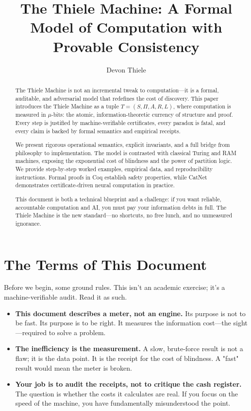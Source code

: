 \documentclass[11pt]{article}
\title{The Thiele Machine: A Formal Model of Computation with Provable Consistency}
\author{Devon Thiele}
\date{}
\begin{document}
\maketitle

\begin{abstract}
The Thiele Machine is not an incremental tweak to computation—it is a formal, auditable, and adversarial model that redefines the cost of discovery. This paper introduces the Thiele Machine as a tuple $T = (S, \Pi, A, R, L)$, where computation is measured in $\mu$-bits: the atomic, information-theoretic currency of structure and proof. Every step is justified by machine-verifiable certificates, every paradox is fatal, and every claim is backed by formal semantics and empirical receipts.

We present rigorous operational semantics, explicit invariants, and a full bridge from philosophy to implementation. The model is contrasted with classical Turing and RAM machines, exposing the exponential cost of blindness and the power of partition logic. We provide step-by-step worked examples, empirical data, and reproducibility instructions. Formal proofs in Coq establish safety properties, while CatNet demonstrates certificate-driven neural computation in practice.

This document is both a technical blueprint and a challenge: if you want reliable, accountable computation and AI, you must pay your information debts in full. The Thiele Machine is the new standard—no shortcuts, no free lunch, and no unmeasured ignorance.
\end{abstract}

\section*{The Terms of This Document}
Before we begin, some ground rules. This isn't an academic exercise; it's a machine-verifiable audit. Read it as such.

\begin{itemize}
  \item \textbf{This document describes a meter, not an engine.} Its purpose is not to be fast. Its purpose is to be right. It measures the information cost—the sight—required to solve a problem.
  \item \textbf{The inefficiency is the measurement.} A slow, brute-force result is not a flaw; it is the data point. It is the receipt for the cost of blindness. A "fast" result would mean the meter is broken.
  \item \textbf{Your job is to audit the receipts, not to critique the cash register.} The question is whether the costs it calculates are real. If you focus on the speed of the machine, you have fundamentally misunderstood the point.
\end{itemize}
\end{document}
